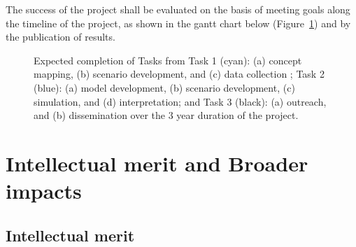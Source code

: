 \documentclass[11pt,a4paper]{article}
\begin{document}
The success of the project shall be evaluated on the basis of 
meeting goals along the timeline of the project,
as shown in the gantt chart below (Figure~\ref{fig:gantt})
and by the publication of results.  

\begin{figure}[!ht]
\centering
  \begin{gantt}{11}{12}
    \begin{ganttitle}
    \end{ganttitle}
    \begin{ganttitle}
    \end{ganttitle}
  \end{gantt}
\label{fig:gantt}
\caption{Expected completion of Tasks from 
				Task 1 (cyan): 	(a) concept mapping, 
										(b) scenario development, and 
										(c) data collection ; 
				Task 2 (blue): 	(a) model development,
										(b) scenario development,
										(c) simulation, and
										(d) interpretation; and
				Task 3 (black):	(a) outreach, and
										(b) dissemination
				over the  3 year duration of the project.}
\end{figure}


\section{Intellectual merit and Broader impacts}


\subsection{Intellectual merit}
\end{document}
